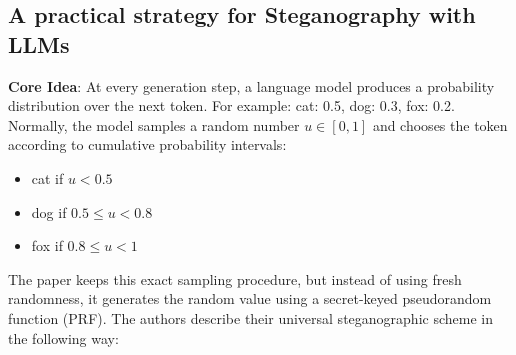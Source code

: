 \documentclass[11pt]{article}
\begin{document}
\subsection{A practical strategy for Steganography with LLMs}
\label{sec:practical-strategy}

\textbf{Core Idea}: At every generation step, a language model produces a
probability distribution over the next token. For example: cat: 0.5, dog: 0.3,
fox: 0.2. Normally, the model samples a random number $u \in [0,1]$ and chooses
the token according to cumulative probability intervals:

\begin{itemize}
  \item cat if $u < 0.5$
  \item dog if $0.5 \leq u < 0.8$
  \item fox if $0.8 \leq u < 1$
\end{itemize}

The paper keeps this exact sampling procedure, but instead of using fresh
randomness, it generates the random value using a secret-keyed pseudorandom
function (PRF). The authors describe their universal steganographic scheme in
the following way:
\end{document}

